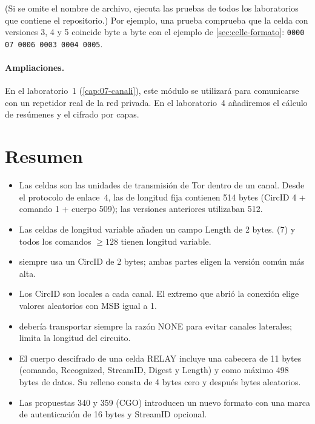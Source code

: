 (Si se omite el nombre de archivo,  ejecuta las pruebas de todos los laboratorios que contiene el repositorio.) Por ejemplo, una prueba comprueba que la celda  con versiones 3, 4 y 5 coincide byte a byte con el ejemplo de \cref{sec:celle-formato}: \texttt{0000 07 0006 0003 0004 0005}.

\paragraph{Ampliaciones.} En el laboratorio~1 (\cref{cap:07-canali}), este módulo se utilizará para comunicarse con un repetidor real de la red privada. En el laboratorio~4 añadiremos el cálculo de resúmenes y el cifrado por capas.

\section*{Resumen}
\begin{itemize}
  \item Las celdas son las unidades de transmisión de Tor dentro de un canal. Desde el protocolo de enlace~4, las de longitud fija contienen 514 bytes (CircID 4 + comando 1 + cuerpo 509); las versiones anteriores utilizaban 512.
  \item Las celdas de longitud variable añaden un campo Length de 2 bytes.  (7) y todos los comandos $\ge 128$ tienen longitud variable.
  \item {} siempre usa un CircID de 2 bytes; ambas partes eligen la versión común más alta.
  \item Los CircID son locales a cada canal. El extremo que abrió la conexión elige valores aleatorios con MSB igual a 1.
  \item {} debería transportar siempre la razón NONE para evitar canales laterales;  limita la longitud del circuito.
  \item El cuerpo descifrado de una celda RELAY incluye una cabecera de 11 bytes (comando, Recognized, StreamID, Digest y Length) y como máximo 498 bytes de datos. Su relleno consta de 4 bytes cero y después bytes aleatorios.
  \item Las propuestas 340 y 359 (CGO) introducen un nuevo formato con una marca de autenticación de 16 bytes y StreamID opcional.
\end{itemize}

